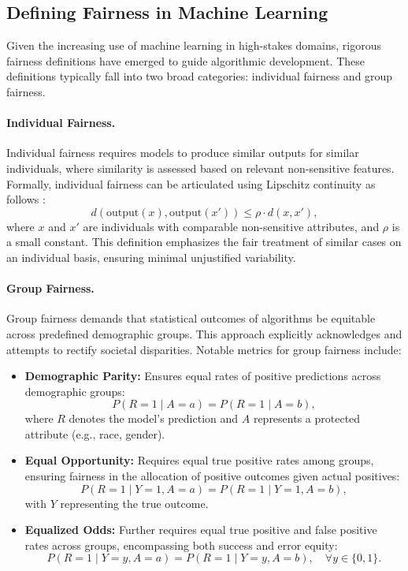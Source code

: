 \subsection{Defining Fairness in Machine Learning}\label{subsec:fairness_definitions}

Given the increasing use of machine learning in high-stakes domains, rigorous fairness definitions have emerged to guide
 algorithmic development. These definitions typically fall into two broad categories: individual fairness and group fairness.

\paragraph{Individual Fairness.}  
Individual fairness requires models to produce similar outputs for similar individuals, where similarity is assessed based
on relevant non-sensitive features. Formally, individual fairness can be articulated using Lipschitz continuity
as follows \cite{dwork2012fairness}:
\[
d(\text{output}(x), \text{output}(x')) \leq \rho \cdot d(x, x'),
\]
where \(x\) and \(x'\) are individuals with comparable non-sensitive attributes, and \(\rho\) is a small constant. This definition
 emphasizes the fair treatment of similar cases on an individual basis, ensuring minimal unjustified variability.

\paragraph{Group Fairness.}  
Group fairness demands that statistical outcomes of algorithms be equitable across predefined demographic groups.
 This approach explicitly acknowledges and attempts to rectify societal disparities. Notable metrics
  for group fairness include:

\begin{itemize}
    \item \textbf{Demographic Parity:} Ensures equal rates of positive predictions across demographic groups:
    \[
    P(R = 1 \mid A = a) = P(R = 1 \mid A = b),
    \]
    where \(R\) denotes the model's prediction and \(A\) represents a protected attribute (e.g., race, gender).

    \item \textbf{Equal Opportunity:} Requires equal true positive rates among groups, ensuring fairness in the
     allocation of positive outcomes given actual positives:
    \[
    P(R = 1 \mid Y = 1, A = a) = P(R = 1 \mid Y = 1, A = b),
    \]
    with \(Y\) representing the true outcome.

    \item \textbf{Equalized Odds:} Further requires equal true positive and false positive rates across groups,
     encompassing both success and error equity:
    \[
    P(R = 1 \mid Y = y, A = a) = P(R = 1 \mid Y = y, A = b), \quad \forall y \in \{0, 1\}.
    \]
\end{itemize}

